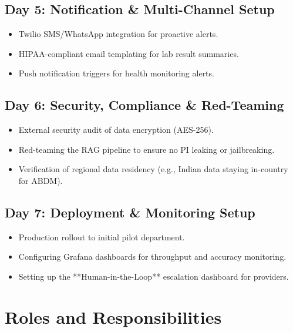 \documentclass[12pt,a4paper]{article}
\begin{document}
\subsection{Day 5: Notification \& Multi-Channel Setup}
\begin{itemize}
    \item Twilio SMS/WhatsApp integration for proactive alerts.
    \item HIPAA-compliant email templating for lab result summaries.
    \item Push notification triggers for health monitoring alerts.
\end{itemize}

\subsection{Day 6: Security, Compliance \& Red-Teaming}
\begin{itemize}
    \item External security audit of data encryption (AES-256).
    \item Red-teaming the RAG pipeline to ensure no PI leaking or jailbreaking.
    \item Verification of regional data residency (e.g., Indian data staying in-country for ABDM).
\end{itemize}

\subsection{Day 7: Deployment \& Monitoring Setup}
\begin{itemize}
    \item Production rollout to initial pilot department.
    \item Configuring Grafana dashboards for throughput and accuracy monitoring.
    \item Setting up the **Human-in-the-Loop** escalation dashboard for providers.
\end{itemize}

\section{Roles and Responsibilities}
\end{document}
